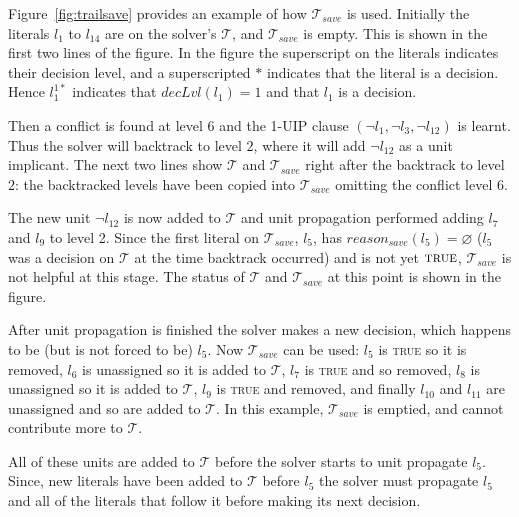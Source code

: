\documentclass[runningheads]{llncs}
\newcommand{\trail}{\ensuremath{\mathcal{T}}}
\newcommand{\dlevel}[1]{\ensuremath{\mathit{decLvl}(#1)}}
\newcommand{\true}{\textsc{true}\xspace}
\newcommand{\reasonsave}[1]{\ensuremath{\mathit{reason_{\mathit{save}}(#1)}}}
\newcommand{\trailsave}{\trail_{\mathit{save}}}
\begin{document}
\begin{example}
    \label{ex:trailsave} Figure~\ref{fig:trailsave} provides an
    example of how $\trailsave$ is used. Initially the literals $l_1$
    to $l_{14}$ are on the solver's $\trail$, and $\trailsave$ is
    empty. This is shown in the first two lines of the figure. In the
    figure the superscript on the literals indicates their decision
    level, and a superscripted $*$ indicates that the literal is a
    decision. Hence $l_1^{1*}$ indicates that $\dlevel{l_1}=1$ and
    that $l_1$ is a decision.

    Then a conflict is found at level $6$ and the 1-UIP clause
    $(\lnot l_1, \lnot l_3, \lnot l_{12})$ is learnt. Thus the solver
    will backtrack to level $2$, where it will add $\lnot l_{12}$ as a
    unit implicant. The next two lines show $\trail$ and $\trailsave$
    right after the backtrack to level $2$: the backtracked levels
    have been copied into $\trailsave$ omitting the conflict level $6$. 

    The new unit $\lnot l_{12}$ is now added to $\trail$ and unit
    propagation performed adding $l_7$ and $l_9$ to level 2. Since the
    first literal on $\trailsave$, $l_5$, has
    $\reasonsave{l_5}=\varnothing$ ($l_5$ was a decision on $\trail$
    at the time backtrack occurred) and is not yet $\true$,
    $\trailsave$ is not helpful at this stage. The status of $\trail$
    and $\trailsave$ at this point is shown in the figure.
    
    After unit propagation is finished the solver makes a new
    decision, which happens to be (but is not forced to be) $l_5$. Now
    $\trailsave$ can be used: $l_5$ is \true so it is removed, $l_6$
    is unassigned so it is added to $\trail$, $l_7$ is \true and so
    removed, $l_8$ is unassigned so it is added to $\trail$, $l_9$ is
    \true and removed, and finally $l_{10}$ and $l_{11}$ are
    unassigned and so are added to $\trail$. In this example,
    $\trailsave$ is emptied, and cannot contribute more to $\trail$.

    All of these units are added to $\trail$ before the solver starts
    to unit propagate $l_5$. Since, new literals have been added to
    $\trail$ before $l_5$ the solver must propagate $l_5$ and all of
    the literals that follow it before making its next
    decision. 
\end{example}
\end{document}
